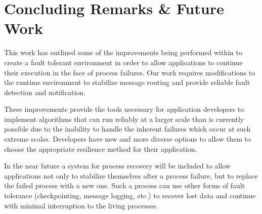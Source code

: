 \section{Concluding Remarks \& Future Work} \label{sect:conclusion}

This work has outlined some of the improvements being performed within \ompi to
create a fault tolerant environment in order to allow applications to continue
their execution in the face of process failures. Our work requires modifications
to the runtime environment to stabilize message routing and provide reliable
fault detection and notification.

%

These improvements provide the tools necessary for application developers to
implement algorithms that can run reliably at a larger scale than is currently 
possible due to the inability to handle the inherent failures which occur at
such extreme scales. Developers have new and more diverse options to allow them
to choose the appropriate resilience method for their application.

In the near future a system for process recovery will be included to
allow applications not only to stabilize themselves after a process failure, but
to replace the failed process with a new one. Such a process can use other forms of fault
tolerance (checkpointing, message logging, etc.) to recover lost data and
continue with minimal interruption to the living processes.

